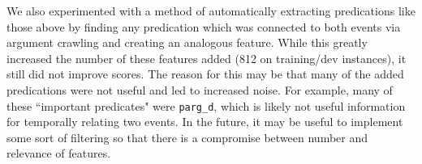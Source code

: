 \documentclass[11pt]{article}
\begin{document}
We also experimented with a method of automatically extracting predications like those above by finding any predication which was connected to both events via argument crawling and creating an analogous feature. While this greatly increased the number of these features added (812 on training/dev instances), it still did not improve scores. The reason for this may be that many of the added predications were not useful and led to increased noise. For example, many of these ``important predicates" were \texttt{parg\_d}, which is likely not useful information for temporally relating two events. In the future, it may be useful to implement some sort of filtering so that there is a compromise between number and relevance of features.

\begin{table*}[t]
\centering
{}
\end{table*}
\end{document}

